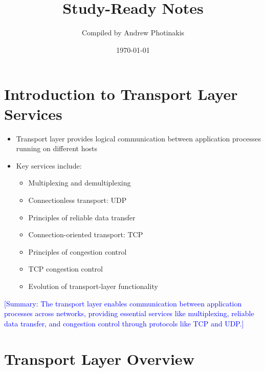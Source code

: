 \documentclass[12pt]{article}
\title{\TOPICTITLE\\\large Study-Ready Notes}
\author{Compiled by Andrew Photinakis}
\date{\today}
\begin{document}
\maketitle
\tableofcontents
\newpage


\section{Introduction to Transport Layer Services}

\begin{itemize}
    \item Transport layer provides logical communication between application processes running on different hosts
    \item Key services include:
          \begin{itemize}
              \item Multiplexing and demultiplexing
              \item Connectionless transport: UDP
              \item Principles of reliable data transfer
              \item Connection-oriented transport: TCP
              \item Principles of congestion control
              \item TCP congestion control
              \item Evolution of transport-layer functionality
          \end{itemize}
\end{itemize}

\textcolor{blue}{[Summary: The transport layer enables communication between application processes across networks, providing essential services like multiplexing, reliable data transfer, and congestion control through protocols like TCP and UDP.]}

\section{Transport Layer Overview}
\end{document}
